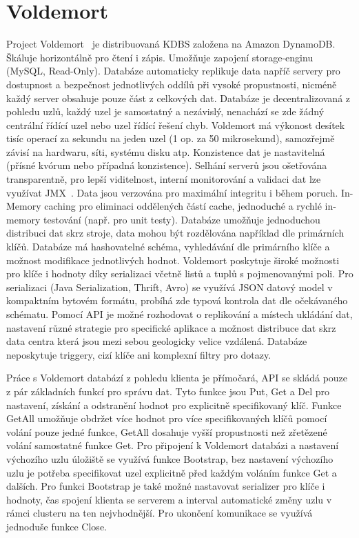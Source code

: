 \documentclass[czech,master,dept460,male,csharp,cpdeclaration]{diploma}
\begin{document}
	\section{Voldemort}
	
	Project Voldemort~\cite{voldemort} je distribuovaná KDBS založena na Amazon DynamoDB. Škáluje horizontálně pro čtení i zápis. Umožňuje zapojení storage-enginu (MySQL, Read-Only). Databáze automaticky replikuje data napříč servery pro dostupnost a bezpečnost jednotlivých oddílů při vysoké propustnosti, nicméně každý server obsahuje pouze část z celkových dat. Databáze je decentralizovaná z pohledu uzlů, každý uzel je samostatný a nezávislý, nenachází se zde žádný centrální řídící uzel nebo uzel řídící řešení chyb. Voldemort má výkonost desítek tisíc operací za sekundu na jeden uzel (1 op. za 50 mikrosekund), samozřejmě závisí na hardwaru, síti, systému disku atp. Konzistence dat je nastavitelná (přísné kvórum nebo případná konzistence). Selhání serverů jsou ošetřována transparentně, pro lepší viditelnost, interní monitorování a validaci dat lze využívat JMX~\cite{jmx}. Data jsou verzována pro maximální integritu i během poruch. In-Memory caching pro eliminaci oddělených částí cache, jednoduché a rychlé in-memory testování (např. pro unit testy). Databáze umožňuje jednoduchou distribuci dat skrz stroje, data mohou být rozdělována například dle primárních klíčů. Databáze má hashovatelné schéma, vyhledávání dle primárního klíče a možnost modifikace jednotlivých hodnot. Voldemort poskytuje široké možnosti pro klíče i hodnoty díky serializaci včetně listů a tuplů s pojmenovanými poli. Pro serializaci (Java Serialization, Thrift, Avro) se využívá JSON datový model v kompaktním bytovém formátu, probíhá zde typová kontrola dat dle očekávaného schématu. Pomocí API je možné rozhodovat o replikování a místech ukládání dat, nastavení různé strategie pro specifické aplikace a možnost distribuce dat skrz data centra která jsou mezi sebou geologicky velice vzdálená. Databáze neposkytuje triggery, cizí klíče ani komplexní filtry pro dotazy.
	
	Práce s Voldemort databází z pohledu klienta je přímočará, API se skládá pouze z pár základních funkcí pro správu dat. Tyto funkce jsou Put, Get a Del pro nastavení, získání a odstranění hodnot pro explicitně specifikovaný klíč. Funkce GetAll umožňuje obdržet více hodnot pro více specifikovaných klíčů pomocí volání pouze jedné funkce, GetAll dosahuje vyšší propustnosti než zřetězené volání samostatné funkce Get. Pro připojení k Voldemort databázi a nastavení výchozího uzlu úložiště se využívá funkce Bootstrap, bez nastavení výchozího uzlu je potřeba specifikovat uzel explicitně před každým voláním funkce Get a dalších. Pro funkci Bootstrap je také možné nastavovat serializer pro klíče i hodnoty, čas spojení klienta se serverem a interval automatické změny uzlu v rámci clusteru na ten nejvhodnější. Pro ukončení komunikace se využívá jednoduše funkce Close.
	
\end{document}
